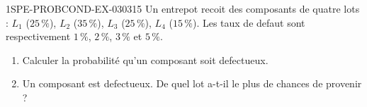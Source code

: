 \begin{exercice}{1SPE-PROBCOND-EX-030}{3}{15}
Un entrepot recoit des composants de quatre lots : $L_1$ ($25\,\%$), $L_2$ ($35\,\%$), $L_3$ ($25\,\%$), $L_4$ ($15\,\%$). Les taux de defaut sont respectivement $1\,\%$, $2\,\%$, $3\,\%$ et $5\,\%$.

\begin{enumerate}
  \item Calculer la probabilité qu'un composant soit defectueux.
  \item Un composant est defectueux. De quel lot a-t-il le plus de chances de provenir ?
\end{enumerate}
\end{exercice}
